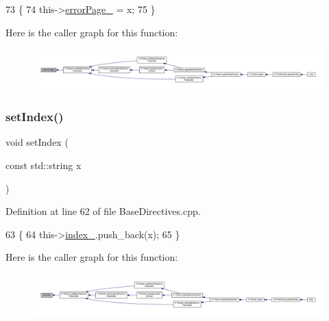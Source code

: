 \begin{DoxyCode}
73     \{
74         this->\hyperlink{classft_1_1_base_directives_a5c0d388109f086503961de84fe3fce90}{errorPage\_} = x;
75     \}
\end{DoxyCode}
Here is the caller graph for this function\+:
\nopagebreak
\begin{figure}[H]
\begin{center}
\leavevmode
\includegraphics[width=350pt]{classft_1_1_base_directives_a505ecc88b3e1779583ad60cc243c7769_icgraph}
\end{center}
\end{figure}
\mbox{\label{classft_1_1_base_directives_a6d3d8fd6eaaf71304128af6b3cee2a69}} 
\subsubsection{\texorpdfstring{set\+Index()}{setIndex()}}
{\footnotesize\ttfamily void set\+Index (\begin{DoxyParamCaption}\item[{const std\+::string}]{x }\end{DoxyParamCaption})\hspace{0.3cm}{\ttfamily [inherited]}}



Definition at line 62 of file Base\+Directives.\+cpp.


\begin{DoxyCode}
63     \{
64         this->\hyperlink{classft_1_1_base_directives_a6ba30626837f300201cd32c35d50aa49}{index\_}.push\_back(x);
65     \}
\end{DoxyCode}
Here is the caller graph for this function\+:
\nopagebreak
\begin{figure}[H]
\begin{center}
\leavevmode
\includegraphics[width=350pt]{classft_1_1_base_directives_a6d3d8fd6eaaf71304128af6b3cee2a69_icgraph}
\end{center}
\end{figure}
\mbox{\label{classft_1_1_base_directives_a0818b8529872ba9622329e2118d20c39}} 
